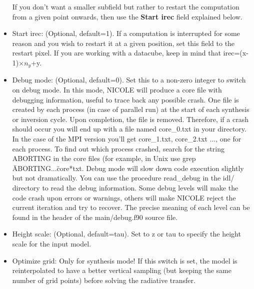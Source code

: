 \begin{itemize}
  If you don't want a smaller subfield but rather to restart the computation
  from a given point onwards, then use the {\bf Start irec} field explained
  below.
\item Start irec: (Optional, default=1). If a computation is interrupted for some reason and
  you wish to restart it at a given position, set this field to the
  restart pixel. If you are working with a datacube, keep in mind that
  irec=(x-1)$\times n_y$+y.
\item Debug mode: (Optional, default=0). Set this to a non-zero
  integer to switch on debug mode. In this mode, NICOLE will produce a
  core file with debugging information, useful to trace back any
  possible crash. One file is created by each process (in case of
  parallel run) at the start of each synthesis or inversion
  cycle. Upon completion, the file is removed.  Therefore, if a crash
  should occur you will end up with a file named core\_0.txt in your
  directory. In the case of the MPI version you'll get core\_1.txt,
  core\_2.txt ..., one for each process. To find out which process
  crashed, search for the string ABORTING in the core files (for
  example, in Unix use grep \"ABORTING...\" core*txt. Debug mode will
  slow down code execution slightly but not dramatically. You can use
  the procedure read\_debug in the idl/ directory to read the debug
  information. Some debug levels will make the code crash upon errors
  or warnings, others will make NICOLE reject the current iteration
  and try to recover. The precise meaning of each level can be
  found in the header of the main/debug.f90 source file.
\item Height scale: (Optional, default=tau). Set to z or tau to
  specify the height scale for the input model.
\item Optimize grid: Only for synthesis mode! If this switch is set,
  the model is reinterpolated to have a better vertical sampling (but
  keeping the same number of grid points) before solving the radiative
  transfer.
\end{itemize}

